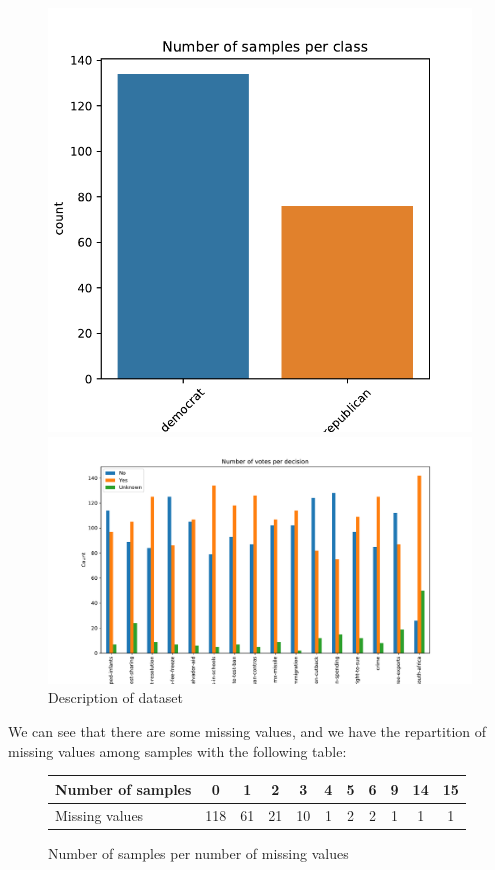 \documentclass[11pt]{article}
\begin{document}
\begin{figure}
\begin{minipage}[t]{0.3\textwidth}
\includegraphics[width=1\linewidth]{voting/classification_trainset.pdf}
\end{minipage}
\begin{minipage}[t]{0.7\textwidth}
\includegraphics[width=1\linewidth]{voting/input_data_description.pdf}
\end{minipage}
   \caption{Description of dataset}
\label{votingfig_fig0}
\end{figure}

We can see that there are some missing values, and we have the repartition of missing values among samples with the following table:
\begin{figure}[h]
\centering
  \begin{tabular}{ | p{5cm} | c | c | c | c | c | c | c | c | c | c |}
    \hline
    Number of samples & 0 & 1 & 2 & 3 & 4 & 5 & 6 & 9 & 14 & 15 \\ \hline
    Missing values & 118 & 61 & 21 & 10 & 1 & 2 & 2 & 1 & 1 & 1 \\
    \hline
    \end{tabular}
    \caption{Number of samples per number of missing values}
    \label{tab_voting0}
  \end{figure}
\end{document}

